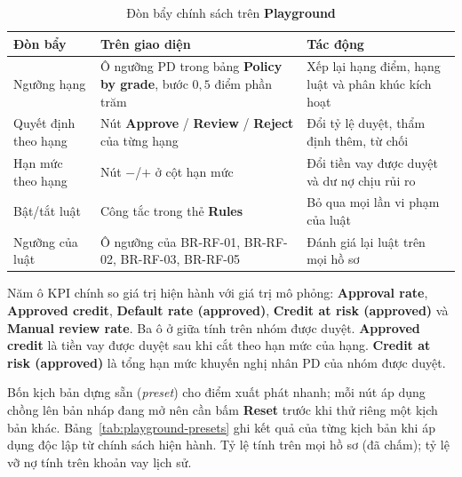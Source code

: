 \begin{table}[H]
	\centering
	\caption{Đòn bẩy chính sách trên \textbf{Playground}}
	\label{tab:playground-levers}
	\footnotesize
	\begin{tabular}{p{} p{} p{}}
		\toprule
		\textbf{Đòn bẩy}     & \textbf{Trên giao diện}                                                      & \textbf{Tác động}                                   \\
		\midrule
		Ngưỡng hạng          & Ô ngưỡng PD trong bảng \textbf{Policy by grade}, bước $0{,}5$ điểm phần trăm & Xếp lại hạng điểm, hạng luật và phân khúc kích hoạt \\
		Quyết định theo hạng & Nút \textbf{Approve} / \textbf{Review} / \textbf{Reject} của từng hạng       & Đổi tỷ lệ duyệt, thẩm định thêm, từ chối            \\
		Hạn mức theo hạng    & Nút $-$/$+$ ở cột hạn mức                                                    & Đổi tiền vay được duyệt và dư nợ chịu rủi ro        \\
		Bật/tắt luật         & Công tắc trong thẻ \textbf{Rules}                                            & Bỏ qua mọi lần vi phạm của luật                     \\
		Ngưỡng của luật      & Ô ngưỡng của BR-RF-01, BR-RF-02, BR-RF-03, BR-RF-05                          & Đánh giá lại luật trên mọi hồ sơ                    \\
		\bottomrule
	\end{tabular}
\end{table}

Năm ô KPI chính so giá trị hiện hành với giá trị mô phỏng: \textbf{Approval rate}, \textbf{Approved credit}, \textbf{Default rate (approved)}, \textbf{Credit at risk (approved)} và \textbf{Manual review rate}. Ba ô ở giữa tính trên nhóm được duyệt. \textbf{Approved credit} là tiền vay được duyệt sau khi cắt theo hạn mức của hạng. \textbf{Credit at risk (approved)} là tổng hạn mức khuyến nghị nhân PD của nhóm được duyệt.

\medskip

Bốn kịch bản dựng sẵn (\textit{preset}) cho điểm xuất phát nhanh; mỗi nút áp dụng chồng lên bản nháp đang mở nên cần bấm \textbf{Reset} trước khi thử riêng một kịch bản khác. Bảng~\ref{tab:playground-presets} ghi kết quả của từng kịch bản khi áp dụng độc lập từ chính sách hiện hành. Tỷ lệ tính trên mọi hồ sơ (đã chấm); tỷ lệ vỡ nợ tính trên khoản vay lịch sử.


